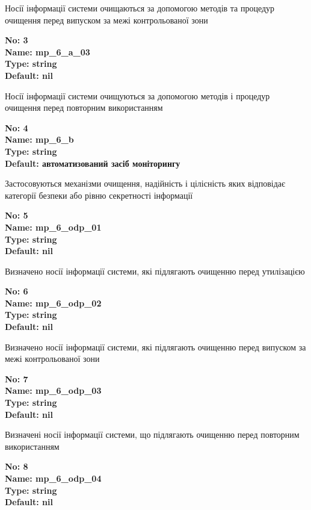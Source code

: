 \documentclass{article}
\begin{document}
{\footnotesize Носії інформації системи очищаються за допомогою методів та процедур очищення перед випуском за межі контрольованої зони}


{\footnotesize\bfseries
No: 3\\
Name: mp\_\allowbreak{}6\_\allowbreak{}a\_\allowbreak{}03\\
Type: string\\
Default: nil
}

{\footnotesize Носії інформації системи очищуються за допомогою методів і процедур очищення перед повторним використанням}


{\footnotesize\bfseries
No: 4\\
Name: mp\_\allowbreak{}6\_\allowbreak{}b\\
Type: string\\
Default: \textquotedbl{}автоматизований засіб моніторингу\textquotedbl{}
}

{\footnotesize Застосовуються механізми очищення, надійність і цілісність яких відповідає категорії безпеки або рівню секретності інформації}


{\footnotesize\bfseries
No: 5\\
Name: mp\_\allowbreak{}6\_\allowbreak{}odp\_\allowbreak{}01\\
Type: string\\
Default: nil
}

{\footnotesize Визначено носії інформації системи, які підлягають очищенню перед утилізацією}


{\footnotesize\bfseries
No: 6\\
Name: mp\_\allowbreak{}6\_\allowbreak{}odp\_\allowbreak{}02\\
Type: string\\
Default: nil
}

{\footnotesize Визначено носії інформації системи, які підлягають очищенню перед випуском за межі контрольованої зони}


{\footnotesize\bfseries
No: 7\\
Name: mp\_\allowbreak{}6\_\allowbreak{}odp\_\allowbreak{}03\\
Type: string\\
Default: nil
}

{\footnotesize Визначені носії інформації системи, що підлягають очищенню перед повторним використанням}


{\footnotesize\bfseries
No: 8\\
Name: mp\_\allowbreak{}6\_\allowbreak{}odp\_\allowbreak{}04\\
Type: string\\
Default: nil
}
\end{document}
